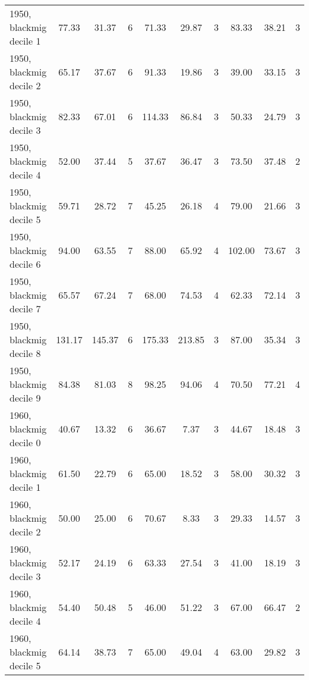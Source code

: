 \begin{table}[htbp]
\begin{tabular}{l*{3}{ccc}}
1950, blackmig decile 1&       77.33&       31.37&           6&       71.33&       29.87&           3&       83.33&       38.21&           3\\
1950, blackmig decile 2&       65.17&       37.67&           6&       91.33&       19.86&           3&       39.00&       33.15&           3\\
1950, blackmig decile 3&       82.33&       67.01&           6&      114.33&       86.84&           3&       50.33&       24.79&           3\\
1950, blackmig decile 4&       52.00&       37.44&           5&       37.67&       36.47&           3&       73.50&       37.48&           2\\
1950, blackmig decile 5&       59.71&       28.72&           7&       45.25&       26.18&           4&       79.00&       21.66&           3\\
1950, blackmig decile 6&       94.00&       63.55&           7&       88.00&       65.92&           4&      102.00&       73.67&           3\\
1950, blackmig decile 7&       65.57&       67.24&           7&       68.00&       74.53&           4&       62.33&       72.14&           3\\
1950, blackmig decile 8&      131.17&      145.37&           6&      175.33&      213.85&           3&       87.00&       35.34&           3\\
1950, blackmig decile 9&       84.38&       81.03&           8&       98.25&       94.06&           4&       70.50&       77.21&           4\\
1960, blackmig decile 0&       40.67&       13.32&           6&       36.67&        7.37&           3&       44.67&       18.48&           3\\
1960, blackmig decile 1&       61.50&       22.79&           6&       65.00&       18.52&           3&       58.00&       30.32&           3\\
1960, blackmig decile 2&       50.00&       25.00&           6&       70.67&        8.33&           3&       29.33&       14.57&           3\\
1960, blackmig decile 3&       52.17&       24.19&           6&       63.33&       27.54&           3&       41.00&       18.19&           3\\
1960, blackmig decile 4&       54.40&       50.48&           5&       46.00&       51.22&           3&       67.00&       66.47&           2\\
1960, blackmig decile 5&       64.14&       38.73&           7&       65.00&       49.04&           4&       63.00&       29.82&           3\\

\end{tabular}
\end{table}
